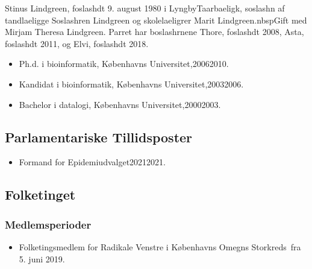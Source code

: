 \documentclass[11pt, a4paper]{awesome-cv}
\begin{document}
\makecvheader[R]
\makelettertitle
\begin{cvletter}
Stinus Lindgreen, foslashdt 9. august 1980 i LyngbyTaarbaeligk, soslashn af tandlaeligge Soslashren Lindgreen og skolelaeligrer Marit Lindgreen.nbspGift med Mirjam Theresa Lindgreen. Parret har boslashrnene Thore, foslashdt 2008, Asta, foslashdt 2011, og Elvi, foslashdt 2018.

\begin{itemize}
\item Ph.d. i bioinformatik, Københavns Universitet,20062010.
\item Kandidat i bioinformatik, Københavns Universitet,20032006.
\item Bachelor i datalogi, Københavns Universitet,20002003.
\end{itemize}
\subsection*{Parlamentariske Tillidsposter}
\begin{itemize}
\item Formand for Epidemiudvalget20212021.
\end{itemize}
\subsection*{Folketinget}
\subsubsection*{Medlemsperioder}
\begin{itemize}
\item Folketingsmedlem for Radikale Venstre i Københavns Omegns Storkreds fra 5. juni 2019.
\end{itemize}

\end{cvletter}
\end{document}
